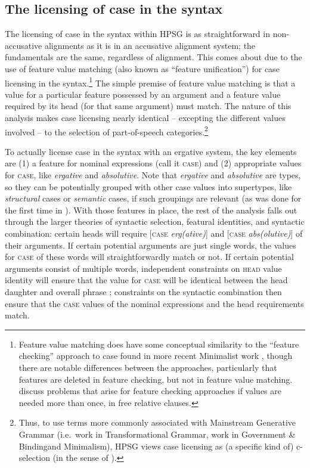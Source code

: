 \documentclass[output=paper
 	        ,biblatex
                ,babelshorthands
                ,newtxmath
                ,draftmode
                ,colorlinks, citecolor=brown
]{langscibook}
\begin{document}
\subsection{The licensing of case in the syntax}

The licensing of case in the syntax within HPSG is as straightforward in non-accusative alignments
as it is in an accusative alignment system; the fundamentals are the same, regardless of
alignment. This comes about due to the use of feature value matching (also known as ``feature
unification'') for case licensing in the syntax.\footnote{Feature value matching does have some
  conceptual similarity to the ``feature checking'' approach to case found in more recent Minimalist
  work \citep{Chomsky91a-u,Chomsky93b-u,adger2000,Adger2010a,framgut06,pestor07}\iaddpages, though
  there are notable differences between the approaches, particularly that features are deleted in
  feature checking, but not in feature value
  matching.  discuss
  problems that arise for feature checking approaches if values are needed more than once, \eg in
  free relative clauses. } The simple premise of feature value matching is that a value for a
particular feature possessed by an argument and a feature value required by its head (for that same
argument) must match. The nature of this analysis makes case licensing nearly identical -- excepting
the different values involved -- to the selection of part-of-speech categories.\footnote{Thus, to
  use terms more commonly associated with Mainstream Generative Grammar (i.e.\ work in
  Transformational Grammar, \eg work in Government \& Binding\indexgb and Minimalism\indexminimalism \citealt{Chomsky81a,Chomsky95a-u}), HPSG views case licensing as (a
  specific kind of) c-selection (in the sense of \citealt{Grimshaw79a-u}).}

To actually license case in the syntax with an ergative system, the key elements are (1) a feature for nominal expressions (call it \textsc{case}) and (2) appropriate values for \textsc{case}, like \textit{ergative} and \textit{absolutive}. Note that \textit{ergative} and \textit{absolutive} are types, so they can be potentially grouped with other case values into supertypes, like \textit{structural} cases or \textit{semantic} cases, if such groupings are relevant (as was done for the first time in \citealt[]{HM94a}). With those features in place, the rest of the analysis falls out through the larger theories of syntactic selection, featural identities, and syntactic combination: certain heads will require [\textsc{case} \textit{erg(ative)}] and [\textsc{case} \textit{abs(olutive)}] of their arguments. If certain potential arguments are just single words, the values for \textsc{case} of these words will straightforwardly match or not. If certain potential arguments consist of multiple words, independent constraints on \textsc{head} value identity will ensure that the value for \textsc{case} will be identical between the head daughter and overall phrase \crossrefchapterp[\pageref{page-hfp}]{properties}; constraints on the syntactic combination then ensure that the \textsc{case} values of the nominal expressions and the head requirements match. 
\end{document}
